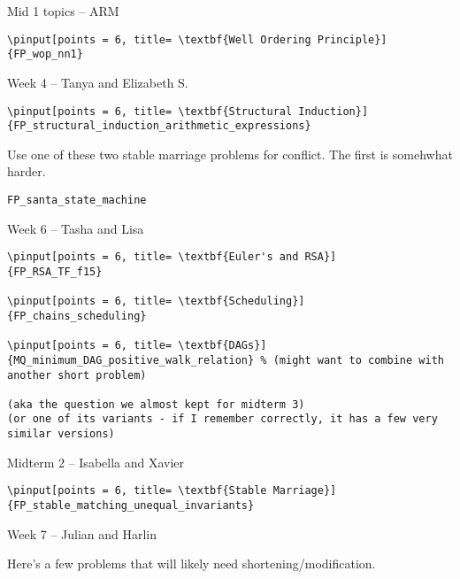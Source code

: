 \documentclass[quiz]{mcs}
\begin{document}
\begin{staffnotes}
\begin{center}
{\large Mid 1 topics -- ARM }
\end{center}

\begin{verbatim}
\pinput[points = 6, title= \textbf{Well Ordering Principle}]
{FP_wop_nn1}
\end{verbatim}

\begin{center}
{\large Week 4 -- Tanya and Elizabeth S.}
\end{center}

\begin{verbatim}
\pinput[points = 6, title= \textbf{Structural Induction}]
{FP_structural_induction_arithmetic_expressions}
\end{verbatim}

Use one of these two stable marriage problems for conflict.  The first
is somehwhat harder.

\begin{verbatim}
FP_santa_state_machine
\end{verbatim}

\begin{center}
{\large Week 6 -- Tasha and Lisa}
\end{center}

\begin{verbatim}
\pinput[points = 6, title= \textbf{Euler's and RSA}]
{FP_RSA_TF_f15}

\pinput[points = 6, title= \textbf{Scheduling}]
{FP_chains_scheduling}

\pinput[points = 6, title= \textbf{DAGs}]
{MQ_minimum_DAG_positive_walk_relation} % (might want to combine with another short problem)

(aka the question we almost kept for midterm 3)
(or one of its variants - if I remember correctly, it has a few very similar versions)

\end{verbatim}

\begin{center}
{\large Midterm 2 -- Isabella and Xavier}
\end{center}

\begin{verbatim}
\pinput[points = 6, title= \textbf{Stable Marriage}]
{FP_stable_matching_unequal_invariants}

\end{verbatim}

\begin{center}
{\large Week 7 -- Julian and Harlin}
\end{center}
Here's a few problems that will likely need shortening/modification.


\end{staffnotes}
\end{document}
